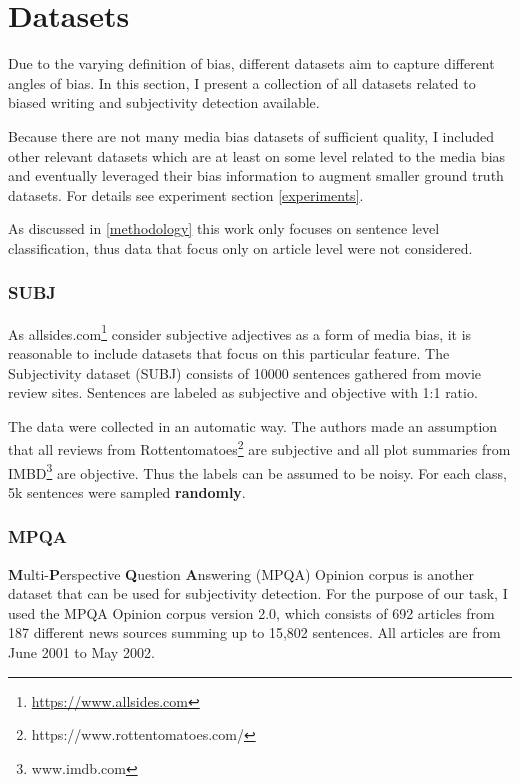 \chapter{Datasets} \label{datasets}
Due to the varying definition of bias, different datasets aim to capture different angles of bias. In this section, I present a collection of all datasets related to biased writing and subjectivity detection available.

Because there are not many media bias datasets of sufficient quality, I included other relevant datasets which are at least on some level related to the media bias and eventually leveraged their bias information to augment smaller ground truth datasets. For details see experiment section \ref{experiments}.

As discussed in \ref{methodology} this work only focuses on sentence level classification, thus data that focus only on article level were not considered.



\subsection[SUBJ]{SUBJ \cite{Pang+Lee:04a}}
As allsides.com\footnote{\url{https://www.allsides.com}} consider subjective adjectives as a form of media bias, it is reasonable to include datasets that focus on this particular feature. The Subjectivity dataset (SUBJ) \cite{Pang+Lee:04a} consists of 10000 sentences gathered from movie review sites. Sentences are labeled as subjective and objective with 1:1 ratio. 

The data were collected in an automatic way. The authors made an assumption that all reviews from Rottentomatoes\footnote{https://www.rottentomatoes.com/} are subjective and all plot summaries from IMBD\footnote{ www.imdb.com} are objective. Thus the labels can be assumed to be noisy. For each class, 5k sentences were sampled \textbf{randomly}.




\subsection{MPQA}
\textbf{M}ulti-\textbf{P}erspective \textbf{Q}uestion \textbf{A}nswering (MPQA) Opinion corpus is another dataset that can be used for subjectivity detection. For the purpose of our task, I used the MPQA Opinion corpus version 2.0, which consists of 692 articles from 187 different news sources summing up to 15,802 sentences. All articles are from June 2001 to May 2002.

